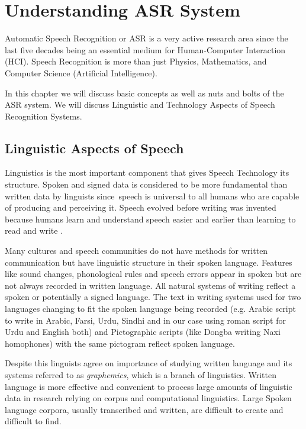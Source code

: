 
\chapter{Understanding ASR System}    %
\label{cha:asr}

Automatic Speech Recognition or ASR is a very active research area since the last five decades \cite{yu_automatic_2015} being an essential medium for Human-Computer Interaction (HCI). Speech Recognition is more than just Physics, Mathematics, and Computer Science (Artificial Intelligence).
\par
In this chapter we will discuss basic concepts as well as nuts and bolts of the ASR system. We will discuss Linguistic and Technology Aspects of Speech Recognition Systems.  

\section{Linguistic Aspects of Speech}
\label{sec:linguistic_aspects_of_speech}

\par
Linguistics is the most important component that gives Speech Technology its structure. Spoken and signed data is considered to be more fundamental than written data by linguists since speech is universal to all humans who are capable of producing and perceiving it. Speech evolved before writing was invented because humans learn and understand speech easier and earlier than learning to read and write \cite{backstrom_introduction_2022}.
\par
Many cultures and speech communities do not have methods for written communication but have linguistic structure in their spoken language. Features like sound changes, phonological rules and speech errors appear in spoken but are not always recorded in written language. All natural systems of writing reflect a spoken or potentially a signed language. The text in writing systems used for two languages changing to fit the spoken language being recorded (e.g. Arabic script to write in Arabic, Farsi, Urdu, Sindhi and in our case using roman script for Urdu and English both) and Pictographic scripts (like Dongba writing Naxi homophones) with the same pictogram reflect spoken language.
\par
Despite this linguists agree on importance of studying written language and its systems referred to as \textit{graphemics}, which is a branch of linguistics. Written language is more effective and convenient to process large amounts of linguistic data in research relying on corpus and computational linguistics. Large Spoken language corpora, usually transcribed and written, are difficult to create and difficult to find.

